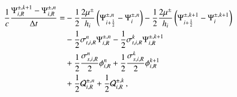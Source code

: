 \begin{equation}\lequ{S2CNfullR}\begin{split}
  \frac{1}{c}\frac{\Psi\iR^{\pm,k+1}-\Psi\iR^{\pm,n}}{\dt} = &
  -\half\frac{2\mu^\pm}{h_i}\fn{\Psi^{\pm,n}_{i+\half} - \Psi^{\pm,n}_i}
  -\half\frac{2\mu^\pm}{h_i}\fn{\Psi^{\pm,k+1}_{i+\half} - \Psi^{\pm,k+1}_i}\\
  &-\half\sigma_{t,i,R}^n\Psi\iR^{\pm,n}
   -\half\sigma_{t,i,R}^k\Psi\iR^{\pm,k+1}\\
  &+\half\frac{\sigma_{s,i,R}^n}{2}\phi\iR^n
   +\half\frac{\sigma_{s,i,R}^k}{2}\phi\iR^{k+1}\\
  &+\half\Q_{i,R}^{\pm,n}
   +\half\Q_{i,R}^{\pm,k} \pec
\end{split}\end{equation}

